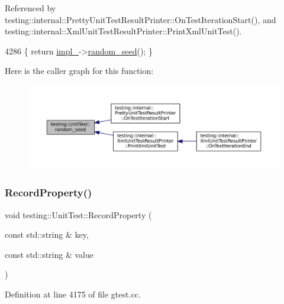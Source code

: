 Referenced by testing\+::internal\+::\+Pretty\+Unit\+Test\+Result\+Printer\+::\+On\+Test\+Iteration\+Start(), and testing\+::internal\+::\+Xml\+Unit\+Test\+Result\+Printer\+::\+Print\+Xml\+Unit\+Test().


\begin{DoxyCode}
4286 \{ \textcolor{keywordflow}{return} \hyperlink{classtesting_1_1UnitTest_a834685f92009d21b21a7307f4cbfb6e5}{impl\_}->\hyperlink{classtesting_1_1internal_1_1UnitTestImpl_a625b9fb6d17b008c44fc902255e6343c}{random\_seed}(); \}
\end{DoxyCode}
Here is the caller graph for this function\+:
\nopagebreak
\begin{figure}[H]
\begin{center}
\leavevmode
\includegraphics[width=350pt]{classtesting_1_1UnitTest_adddc090a06f2d3a0e68f3762ee262688_icgraph}
\end{center}
\end{figure}
\mbox{\label{classtesting_1_1UnitTest_a2c96a4a02c34095e07c6999e7686367f}} 
\subsubsection{\texorpdfstring{Record\+Property()}{RecordProperty()}}
{\footnotesize\ttfamily void testing\+::\+Unit\+Test\+::\+Record\+Property (\begin{DoxyParamCaption}\item[{const std\+::string \&}]{key,  }\item[{const std\+::string \&}]{value }\end{DoxyParamCaption})\hspace{0.3cm}{\ttfamily [private]}}



Definition at line 4175 of file gtest.\+cc.



